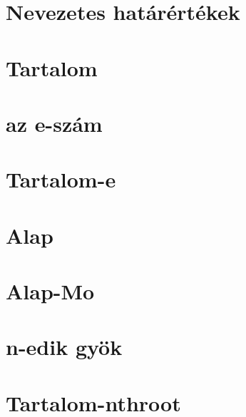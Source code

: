 






\begin{spacing}{1.2}


   \section*{Nevezetes határértékek}

   \section*{Tartalom} \label{Tart}
         \newline
         \newline
      \newpage
      \section*{az e-szám} \label{e}
      \section*{Tartalom-e} \label{Tarte}
         \newline
         \newpage
         \section*{Alap} \label{e1}
         \Fa{
            
         }
         \newpage
         \section*{Alap-Mo} \label{e1Mo}
         \Mo{
            
         }
         \newpage
      \section*{n-edik gyök} \label{nthroot}
      \section*{Tartalom-nthroot} \label{Tartnthroot}
         \newline
         \newline
         \newpage

\end{spacing}
